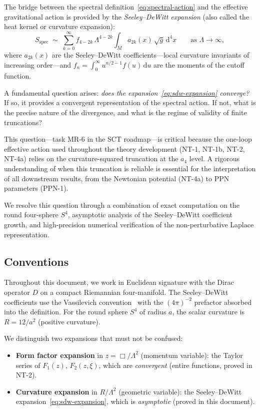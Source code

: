 \documentclass[11pt,a4paper]{article}
\renewcommand{\dd}{\mathrm{d}}
\newcommand{\Lam}{\Lambda}
\theoremstyle{plain}
\theoremstyle{definition}
\begin{document}
The bridge between the spectral definition~\eqref{eq:spectral-action} and the
effective gravitational action is provided by the \emph{Seeley--DeWitt expansion}
(also called the heat kernel or curvature expansion):
\begin{equation}\label{eq:sdw-expansion}
  S_{\text{spec}} \;\sim\; \sum_{k=0}^{\infty}
  f_{4-2k}\,\Lam^{4-2k}\int_M a_{2k}(x)\,\sqrt{g}\,\dd^4 x
  \qquad \text{as } \Lam \to \infty,
\end{equation}
where $a_{2k}(x)$ are the Seeley--DeWitt coefficients---local curvature
invariants of increasing order---and $f_n = \int_0^\infty u^{n/2-1} f(u)\,\dd u$
are the moments of the cutoff function.

A fundamental question arises: \emph{does the expansion~\eqref{eq:sdw-expansion}
converge?}  If so, it provides a convergent representation of the spectral action.
If not, what is the precise nature of the divergence, and what is the regime of
validity of finite truncations?

This question---task MR-6 in the SCT roadmap---is critical because the one-loop
effective action used throughout the theory development (NT-1, NT-1b, NT-2, NT-4a)
relies on the curvature-squared truncation at the $a_4$ level.  A rigorous
understanding of when this truncation is reliable is essential for the
interpretation of all downstream results, from the Newtonian potential (NT-4a)
to PPN parameters (PPN-1).

We resolve this question through a combination of exact computation on the round
four-sphere $S^4$, asymptotic analysis of the Seeley--DeWitt coefficient growth,
and high-precision numerical verification of the non-perturbative Laplace
representation.

\subsection{Conventions}

Throughout this document, we work in Euclidean signature with the Dirac operator
$D$ on a compact Riemannian four-manifold.  The Seeley--DeWitt coefficients
use the Vassilevich convention~\cite{V03} with the $(4\pi)^{-2}$ prefactor
absorbed into the definition.  For the round sphere $S^4$ of radius $a$,
the scalar curvature is $R = 12/a^2$ (positive curvature).

We distinguish two expansions that must not be confused:
\begin{itemize}
  \item \textbf{Form factor expansion} in $z = \Box/\Lam^2$ (momentum variable):
    the Taylor series of $F_1(z)$, $F_2(z,\xi)$, which are \emph{convergent}
    (entire functions, proved in NT-2).
  \item \textbf{Curvature expansion} in $R/\Lam^2$ (geometric variable):
    the Seeley--DeWitt expansion~\eqref{eq:sdw-expansion}, which is
    \emph{asymptotic} (proved in this document).
\end{itemize}
\end{document}
